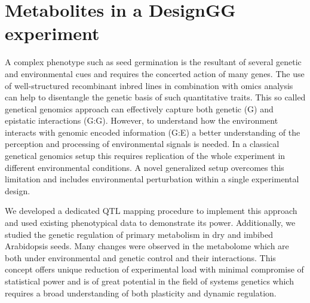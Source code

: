 \section{Metabolites in a DesignGG experiment}
\label{sect:Metabolites}
A complex phenotype such as seed germination is the resultant of several genetic and environmental 
cues and requires the concerted action of many genes. The use of well-structured recombinant inbred 
lines in combination with omics analysis can help to disentangle the genetic basis of such 
quantitative traits. This so called genetical genomics approach can effectively capture both 
genetic (G) and epistatic interactions (G:G). However, to understand how the environment interacts 
with genomic encoded information (G:E) a better understanding of the perception and processing of 
environmental signals is needed. In a classical genetical genomics setup this requires replication 
of the whole experiment in different environmental conditions. A novel generalized setup overcomes 
this limitation and includes environmental perturbation within a single experimental design. 

We developed a dedicated QTL mapping procedure to implement this approach and used existing 
phenotypical data to demonstrate its power. Additionally, we studied the genetic regulation of 
primary metabolism in dry and imbibed Arabidopsis seeds. Many changes were observed in the 
metabolome which are both under environmental and genetic control and their interactions. 
This concept offers unique reduction of experimental load with minimal compromise of statistical 
power and is of great potential in the field of systems genetics which requires a broad 
understanding of both plasticity and dynamic regulation.

